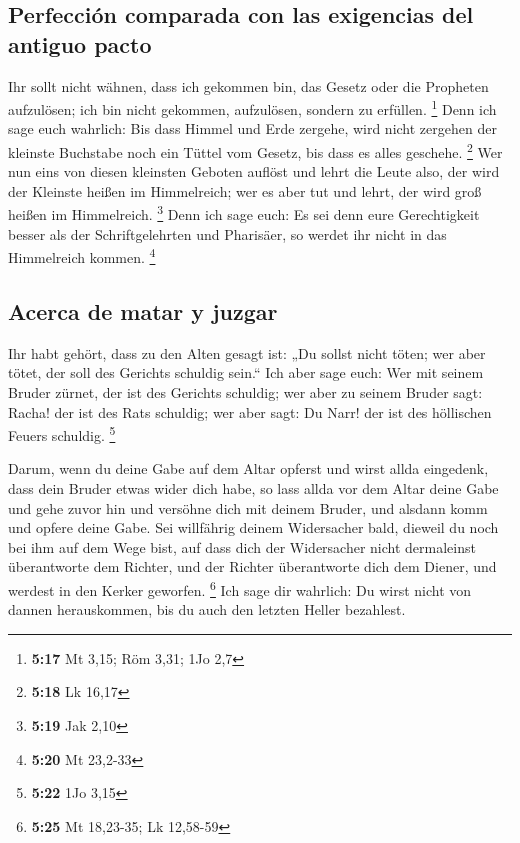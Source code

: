 \hypertarget{perfecciuxf3n-comparada-con-las-exigencias-del-antiguo-pacto}{%
\subsection{Perfección comparada con las exigencias del antiguo
pacto}\label{perfecciuxf3n-comparada-con-las-exigencias-del-antiguo-pacto}}

 Ihr sollt nicht wähnen, dass ich gekommen bin, das
Gesetz oder die Propheten aufzulösen; ich bin nicht gekommen,
aufzulösen, sondern zu erfüllen. \footnote{\textbf{5:17} Mt 3,15; Röm
  3,31; 1Jo 2,7}  Denn ich sage euch wahrlich: Bis dass
Himmel und Erde zergehe, wird nicht zergehen der kleinste Buchstabe noch
ein Tüttel vom Gesetz, bis dass es alles geschehe. \footnote{\textbf{5:18}
  Lk 16,17}  Wer nun eins von diesen kleinsten Geboten
auflöst und lehrt die Leute also, der wird der Kleinste heißen im
Himmelreich; wer es aber tut und lehrt, der wird groß heißen im
Himmelreich. \footnote{\textbf{5:19} Jak 2,10}  Denn ich
sage euch: Es sei denn eure Gerechtigkeit besser als der
Schriftgelehrten und Pharisäer, so werdet ihr nicht in das Himmelreich
kommen. \footnote{\textbf{5:20} Mt 23,2-33}

\hypertarget{acerca-de-matar-y-juzgar}{%
\subsection{Acerca de matar y juzgar}\label{acerca-de-matar-y-juzgar}}

 Ihr habt gehört, dass zu den Alten gesagt ist: „Du
sollst nicht töten; wer aber tötet, der soll des Gerichts schuldig
sein.``  Ich aber sage euch: Wer mit seinem Bruder
zürnet, der ist des Gerichts schuldig; wer aber zu seinem Bruder sagt:
Racha! der ist des Rats schuldig; wer aber sagt: Du Narr! der ist des
höllischen Feuers schuldig. \footnote{\textbf{5:22} 1Jo 3,15}

 Darum, wenn du deine Gabe auf dem Altar opferst und
wirst allda eingedenk, dass dein Bruder etwas wider dich habe,
 so lass allda vor dem Altar deine Gabe und gehe zuvor
hin und versöhne dich mit deinem Bruder, und alsdann komm und opfere
deine Gabe.  Sei willfährig deinem Widersacher bald,
dieweil du noch bei ihm auf dem Wege bist, auf dass dich der Widersacher
nicht dermaleinst überantworte dem Richter, und der Richter überantworte
dich dem Diener, und werdest in den Kerker geworfen. \footnote{\textbf{5:25}
  Mt 18,23-35; Lk 12,58-59}  Ich sage dir wahrlich: Du
wirst nicht von dannen herauskommen, bis du auch den letzten Heller
bezahlest.

